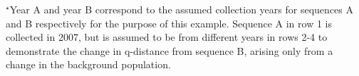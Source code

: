 \begin{table}[!ht]
\def\ACOL{teal!30}
\def\BCOL{Red1!30}
\def\CCOL{gray!30}
\label{tabex}

\flushleft
$^\star$Year A and year B correspond to the assumed collection years for sequences A and B respectively for the purpose of this example. Sequence A in row 1 is collected in 2007, but is assumed to be from different years in rows 2-4 to demonstrate the change in q-distance from sequence B, arising only from a change in the background population.
\end{table}

